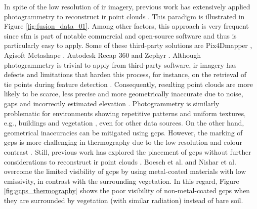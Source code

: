 In spite of the low resolution of \acrshort{ir} imagery, previous work has extensively applied photogrammetry to reconstruct \acrshort{ir} point clouds \cite{dahaghin_precise_2021, dahaghin_3d_2019, gonzalez_thermal_2019, grechi_3d_2021, webster_three-dimensional_2018, sledz_thermal_2018, kniaz_thermal_2018, hoegner_mobile_2018, zheng_thermal_2020, guilbert_fusion_2020}. This paradigm is illustrated in Figure \ref{fig:fusion_data_01}. Among other factors, this approach is very frequent since \acrshort{sfm} is part of notable commercial and open-source software and thus is particularly easy to apply. Some of these third-party solutions are Pix4Dmapper \cite{zheng_thermal_2020}, Agisoft Metashape \cite{grechi_3d_2021, guilbert_fusion_2020, lin_fusion_2019, macher_combination_2019}, Autodesk Recap 360 \cite{lafi_3d_2017} and Zephyr \cite{maset_photogrammetric_2017, clarkson_thermal_2017}. Although photogrammetry is trivial to apply from third-party software, \acrshort{ir} imagery has defects and limitations that harden this process, for instance, on the retrieval of tie points during feature detection \cite{lin_fusion_2019}. Consequently, resulting point clouds are more likely to be scarce, less precise and more geometrically inaccurate due to noise, gaps and incorrectly estimated elevation \cite{kong_3-d_2018}. Photogrammetry is similarly problematic for environments showing repetitive patterns and uniform textures, e.g., buildings and vegetation \cite{lin_fusion_2019, jarzabek-rychard_supervised_2020}, even for other data sources. On the other hand, geometrical inaccuracies can be mitigated using \acrshort{gcp}s. However, the marking of \acrshort{gcp}s is more challenging in thermography due to the low resolution and colour contrast \cite{sledz_thermal_2018}. Still, previous work has explored the placement of \acrshort{gcp}s without further considerations to reconstruct \acrshort{ir} point clouds \cite{dahaghin_precise_2021, gonzalez_thermal_2019, zheng_thermal_2020, sledz_thermal_2018}. Boesch et al. \cite{boesch_thermal_2017} and Nishar et al. \cite{nishar_thermal_2016} overcome the limited visibility of \acrshort{gcp}s by using metal-coated materials with low emissivity, in contrast with the surrounding vegetation. In this regard, Figure \ref{fig:gcps_thermography} shows the poor visibility of non-metal-coated \acrshort{gcp}s when they are surrounded by vegetation (with similar radiation) instead of bare soil. 

